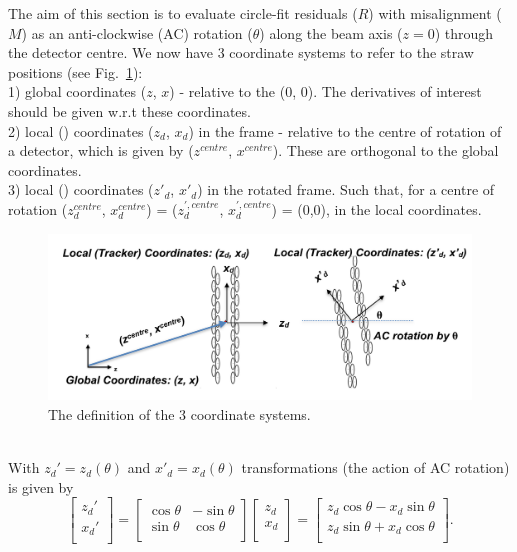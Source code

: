 \documentclass[a4paper,11pt]{article}
\begin{document}
The aim of this section is to evaluate circle-fit residuals ($R$) with misalignment ($M$) as an anti-clockwise (AC) rotation ($\theta$) along the beam axis ($z=0$) through the detector centre. We now have 3 coordinate systems to refer to the straw positions (see Fig.~\ref{fig:theta}): \\
1) global coordinates ($z$, $x$) - relative to the  (0, 0). The derivatives of interest should be given w.r.t these coordinates. \\ 
2) local () coordinates ($z_d$, $x_d$) in the  frame - relative to the centre of rotation of a detector, which is given by ($z^{centre}$, $x^{centre}$). These are orthogonal to the global coordinates. \\ 
3) local () coordinates ($z'_{d}$, $x'_d$) in the rotated frame. Such that, for a centre of rotation ($z^{centre}_d$, $x^{centre}_d$) = ($z^{',centre}_{d}$, $x^{',centre}_d$) = (0,0), in the local coordinates.
\begin{figure}[!ht]
\centering
\includegraphics[width=0.9\linewidth]{fig/2Drot.png}
\caption{The definition of the 3 coordinate systems.}
\label{fig:theta}
\end{figure}\\
With $z_d'=z_d(\theta)$ and $x'_d=x_d(\theta)$ transformations (the action of AC rotation) is given by
\begin{equation}
\begin{bmatrix}z_d'\\x_d'\\\end{bmatrix}=\begin{bmatrix}\cos \theta &-\sin \theta \\\sin \theta &\cos \theta \\\end{bmatrix} \begin{bmatrix}z_d\\x_d\\\end{bmatrix} = \begin{bmatrix}z_d\cos \theta -x_d\sin \theta \\z_d\sin \theta +x_d\cos \theta \\\end{bmatrix}.
\end{equation}
\end{document}
